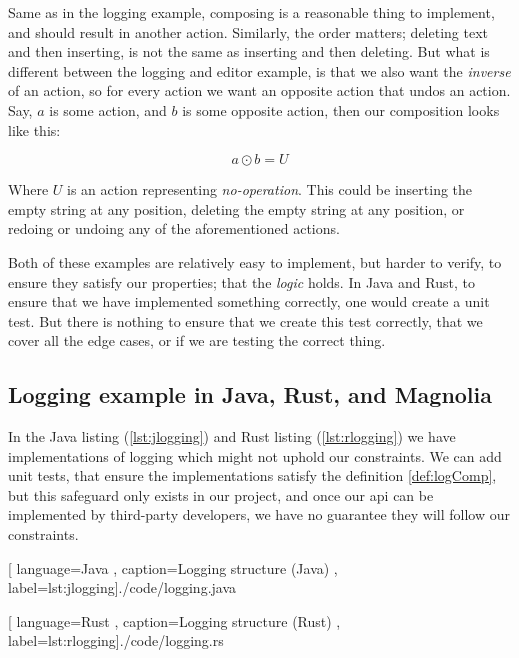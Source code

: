 Same as in the logging example, composing is a reasonable thing to implement,
and should result in another action. Similarly, the order matters; deleting text
and then inserting, is not the same as inserting and then deleting. But what is
different between the logging and editor example, is that we also want the
\textit{inverse} of an action, so for every action we want an opposite action
that undos an action. Say, $a$ is some action, and $b$ is some opposite action,
then our composition looks like this:

\begin{definition} \label{def:actComp}
  \begin{equation}
    a \odot b = U
  \end{equation}
\end{definition}

Where $U$ is an action representing \textit{no-operation}. This could be
inserting the empty string at any position, deleting the empty string at any
position, or redoing or undoing any of the aforementioned actions.

Both of these examples are relatively easy to implement, but harder to verify,
to ensure they satisfy our properties; that the \textit{logic} holds. In Java
and Rust, to ensure that we have implemented something correctly, one would
create a unit test. But there is nothing to ensure that we create this test
correctly, that we cover all the edge cases, or if we are testing the correct
thing.

\subsection{Logging example in Java, Rust, and Magnolia}

In the Java listing (\ref{lst:jlogging}) and Rust listing (\ref{lst:rlogging})
we have implementations of logging which might not uphold our constraints. We
can add unit tests, that ensure the implementations satisfy the definition
\ref{def:logComp}, but this safeguard only exists in our project, and once our
\gls*{api} can be implemented by third-party developers, we have no guarantee
they will follow our constraints.

\begin{center}
  
    [ language=Java
    , caption={Logging structure (Java)}
    , label=lst:jlogging]{./code/logging.java}
\end{center}

\begin{center}
  
    [ language=Rust
    , caption={Logging structure (Rust)}
    , label=lst:rlogging]{./code/logging.rs}
\end{center}

